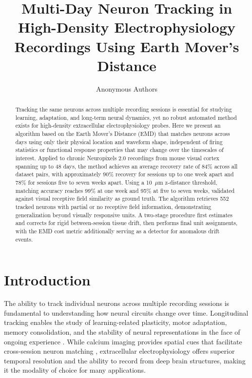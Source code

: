 \documentclass[12pt]{article}
\title{Multi-Day Neuron Tracking in High-Density Electrophysiology Recordings Using Earth Mover's Distance}
\author{Anonymous Authors}
\date{}
\begin{document}
\maketitle

\begin{abstract}
Tracking the same neurons across multiple recording sessions is essential for studying learning, adaptation, and long-term neural dynamics, yet no robust automated method exists for high-density extracellular electrophysiology probes. Here we present an algorithm based on the Earth Mover's Distance (EMD) that matches neurons across days using only their physical location and waveform shape, independent of firing statistics or functional response properties that may change over the timescales of interest. Applied to chronic Neuropixels 2.0 recordings from mouse visual cortex spanning up to 48 days, the method achieves an average recovery rate of 84\% across all dataset pairs, with approximately 90\% recovery for sessions up to one week apart and 78\% for sessions five to seven weeks apart. Using a 10~$\mu$m z-distance threshold, matching accuracy reaches 99\% at one week and 95\% at five to seven weeks, validated against visual receptive field similarity as ground truth. The algorithm retrieves 552 tracked neurons with partial or no receptive field information, demonstrating generalization beyond visually responsive units. A two-stage procedure first estimates and corrects for rigid between-session tissue drift, then performs final unit assignments, with the EMD cost metric additionally serving as a detector for anomalous drift events.
\end{abstract}

\section{Introduction}

The ability to track individual neurons across multiple recording sessions is fundamental to understanding how neural circuits change over time. Longitudinal tracking enables the study of learning-related plasticity, motor adaptation, memory consolidation, and the stability of neural representations in the face of ongoing experience \citep{chestek2007single, dhawale2017automated}. While calcium imaging provides spatial cues that facilitate cross-session neuron matching \citep{sheintuch2017tracking}, extracellular electrophysiology offers superior temporal resolution and the ability to record from deep brain structures, making it the modality of choice for many applications.
\end{document}
